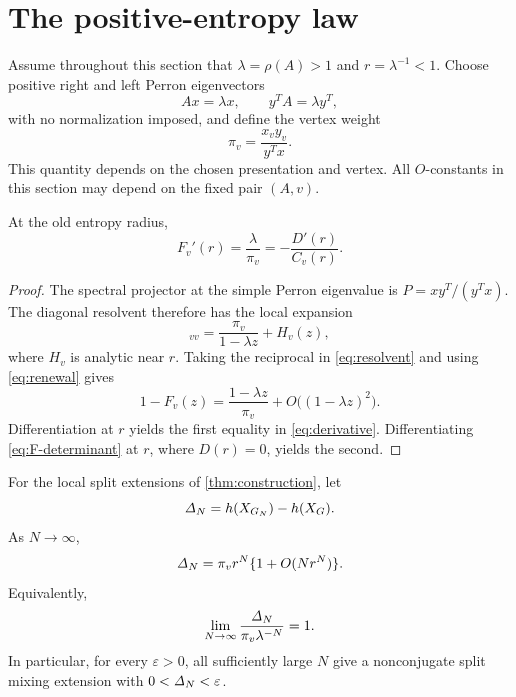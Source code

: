 \section{The positive-entropy law}
\label{sec:positive}

Assume throughout this section that $\lambda=\rho(A)>1$ and
$r=\lambda^{-1}<1$.  Choose positive right and left Perron eigenvectors
\[
 Ax=\lambda x,\qquad y^TA=\lambda y^T,
\]
with no normalization imposed, and define the vertex weight
\begin{equation}
 \pi_v=\frac{x_vy_v}{y^Tx}.
 \label{eq:pi}
\end{equation}
This quantity depends on the chosen presentation and vertex.
All $O$-constants in this section may depend on the fixed pair $(A,v)$.

\begin{lemma}
\label{lem:derivative}
At the old entropy radius,
\begin{equation}
 F_v'(r)=\frac{\lambda}{\pi_v}
 =-\frac{D'(r)}{C_v(r)}.
 \label{eq:derivative}
\end{equation}
\end{lemma}

\begin{proof}
The spectral projector at the simple Perron eigenvalue is
$P=xy^T/(y^Tx)$.  The diagonal resolvent therefore has the local expansion
\begin{equation}
 [(I-zA)^{-1}]_{vv}
 =\frac{\pi_v}{1-\lambda z}+H_v(z),
 \label{eq:resolvent}
\end{equation}
where $H_v$ is analytic near $r$.  Taking the reciprocal in
\cref{eq:resolvent} and using \cref{eq:renewal} gives
\[
 1-F_v(z)=\frac{1-\lambda z}{\pi_v}
 +O\bigl((1-\lambda z)^2\bigr).
\]
Differentiation at $r$ yields the first equality in
\cref{eq:derivative}.  Differentiating
\cref{eq:F-determinant} at $r$, where $D(r)=0$, yields the second.
\end{proof}

\begin{theorem}
\label{thm:positive}
For the local split extensions of \cref{thm:construction}, let
\[
 \mathit\Delta_N=h(X_{G_N})-h(X_G).
\]
As $N\to\infty$,
\begin{equation}
 \mathit\Delta_N=\pi_v r^N\{1+O(Nr^N)\}.
 \label{eq:positive-law}
\end{equation}
Equivalently,
\begin{equation}
 \lim_{N\to\infty}
 \frac{\mathit\Delta_N}{\pi_v\lambda^{-N}}=1.
 \label{eq:ratio-limit}
\end{equation}
In particular, for every $\varepsilon>0$, all sufficiently large $N$ give a
nonconjugate split mixing extension with
$0<\mathit\Delta_N<\varepsilon$.
\end{theorem}

